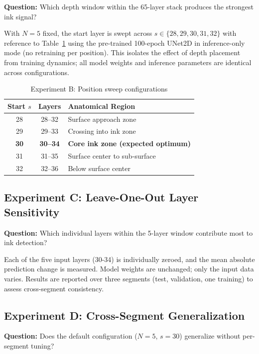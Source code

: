 \textbf{Question:} Which depth window within the 65-layer stack produces the strongest ink signal?

With $N = 5$ fixed, the start layer is swept across $s \in \{28, 29, 30, 31, 32\}$ with reference to Table~\ref{tab:position_sweep} using the pre-trained 100-epoch UNet2D in inference-only mode (no retraining per position). This isolates the effect of depth placement from training dynamics; all model weights and inference parameters are identical across configurations.

\begin{table}[h]
\centering
\caption{Experiment B: Position sweep configurations}
\label{tab:position_sweep}
\begin{tabular}{ccl}
\hline
Start $s$ & Layers & Anatomical Region \\
\hline
28 & 28--32 & Surface approach zone \\
29 & 29--33 & Crossing into ink zone \\
\textbf{30} & \textbf{30--34} & \textbf{Core ink zone (expected optimum)} \\
31 & 31--35 & Surface center to sub-surface \\
32 & 32--36 & Below surface center \\
\hline
\end{tabular}
\end{table}

\subsection{Experiment C: Leave-One-Out Layer Sensitivity}
\label{sec:exp_c}

\textbf{Question:} Which individual layers within the 5-layer window contribute most to ink detection?

Each of the five input layers (30-34) is individually zeroed, and the mean absolute prediction change is measured. Model weights are unchanged; only the input data varies. Results are reported over three segments (test, validation, one training) to assess cross-segment consistency.

\subsection{Experiment D: Cross-Segment Generalization}
\label{sec:exp_d}

\textbf{Question:} Does the default configuration ($N = 5$, $s = 30$) generalize without per-segment tuning?


